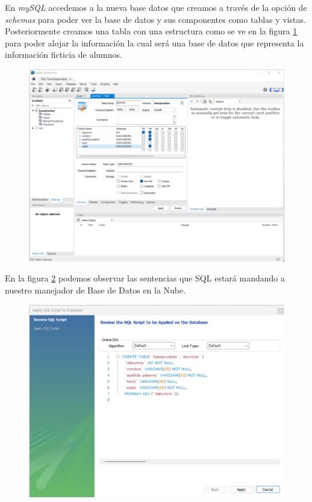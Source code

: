 \documentclass[12pt,a4paper]{article}
\begin{document}
En \textit{mySQL} accedemos a la nueva base datos que creamos a través de la opción de \textit{schemas} para poder ver la base de datos y sus componentes como tablas y vistas. Posteriormente creamos una tabla con una estructura como se ve en la figura \ref{fig:2_3_1_Google_DBMS} para poder alojar la información la cual será una base de datos que representa la información ficticia de alumnos.

\begin{figure}[H]
    \centering
    \includegraphics[width=.65\linewidth]{M4_Servicios_Cómputo_en_la_Nube/Tarea_6_Creación_sistema_administración_Base_de_Datos/reporte/figuras/2_3_1_Google_DBMS.png}
    \label{fig:2_3_1_Google_DBMS}
\end{figure}

En la figura \ref{fig:2_3_2_Google_DBMS} podemos observar las sentencias que SQL estará mandando a nuestro manejador de Base de Datos en la Nube.

\begin{figure}[H]
    \centering
    \includegraphics[width=.65\linewidth]{M4_Servicios_Cómputo_en_la_Nube/Tarea_6_Creación_sistema_administración_Base_de_Datos/reporte/figuras/2_3_2_Google_DBMS.png}
    \label{fig:2_3_2_Google_DBMS}
\end{figure}
\end{document}
